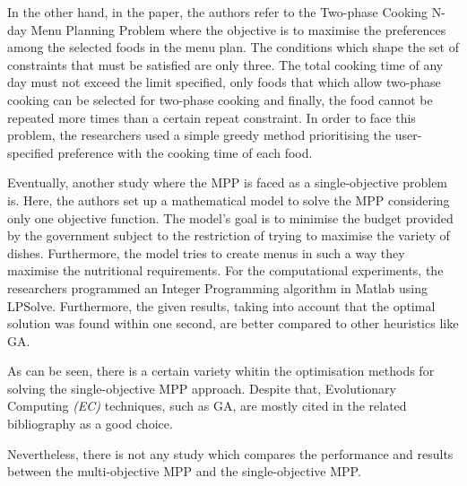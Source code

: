 In the other hand, in the paper\cite{Funabiki2011}, the authors refer to the Two-phase Cooking N-day Menu Planning Problem where the objective is to maximise the preferences among the selected foods in the menu plan. The conditions which shape the set of constraints that must be satisfied are only three. The total cooking time of any day must not exceed the limit specified, only foods that which allow two-phase cooking can be selected for two-phase cooking and finally, the food cannot be repeated more times than a certain repeat constraint. In order to face this problem, the researchers used a simple greedy method prioritising the user-specified preference with the cooking time of each food.

Eventually, another study where the MPP is faced as a single-objective problem is\cite{Sufahani2014}. Here, the authors set up a mathematical model to solve the MPP considering only one objective function. The model's goal is to minimise the budget provided by the government subject to the restriction of trying to maximise the variety of dishes. Furthermore, the model tries to create menus in such a way they maximise the nutritional requirements. For the computational experiments, the researchers programmed an Integer Programming algorithm in Matlab using LPSolve. Furthermore, the given results, taking into account that the optimal solution was found within one second, are better compared to other heuristics like GA.

As can be seen, there is a certain variety whitin the optimisation methods for solving the single-objective MPP approach. Despite that, Evolutionary Computing \textit{(EC)} techniques, such as GA, are mostly cited in the related bibliography as a good choice\cite{Ngo2016, Seljak2009, Moreira2018}. 

Nevertheless, there is not any study which compares the performance and results between the multi-objective MPP and the single-objective MPP. 